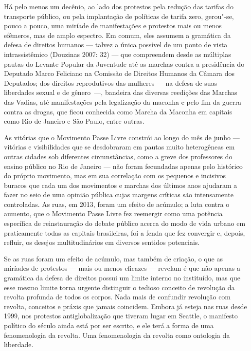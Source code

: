 Há pelo menos um decênio, ao lado dos protestos pela redução das tarifas
do transporte público, ou pela implantação de políticas de tarifa zero,
gerou"-se, pouco a pouco, uma miríade de manifestações e protestos mais
ou menos efêmeros, mas de amplo espectro. Em comum, eles assumem a
gramática da defesa de direitos humanos --- talvez a única possível de um
ponto de vista intrassistêmico (Douzinas 2007: 32) --- que compreendem
desde as múltiplas pautas do Levante Popular da Juventude até as marchas
contra a presidência do Deputado Marco Feliciano na Comissão de Direitos
Humanos da Câmara dos Deputados; dos direitos reprodutivos das mulheres
--- na defesa de suas liberdades sexual e de gênero~---, bandeira das
diversas reedições das Marchas das Vadias, até manifestações pela
legalização da maconha e pelo fim da guerra contra as drogas, que ficou
conhecida como Marcha da Maconha em capitais como Rio de Janeiro e São
Paulo, entre outras.

As vitórias que o Movimento Passe Livre constrói ao longo do mês de
junho --- vitórias e visibilidades que se desdobraram em pautas muito
heterogêneas em outras cidades sob diferentes circunstâncias, como a
greve dos professores do ensino público no Rio de Janeiro --- não foram
fecundadas apenas pelo histórico do próprio movimento, mas em sua
correlação com os pequenos e incisivos buracos que cada um dos
movimentos e marchas dos últimos anos ajudaram a fazer no seio de uma
opinião pública cujas margens críticas são intensamente controladas. As
ruas, em 2013, foram um efeito de acúmulo; a luta contra o aumento, que
o Movimento Passe Livre fez reemergir como uma potência específica de
reinstauração do debate público acerca do modo de vida urbano em
praticamente todas as capitais brasileiras, foi a fenda que fez
convergir e, depois, refluir, os desejos multitudinários em diversos
sentidos potenciais.

Se as ruas foram um efeito de acúmulo, mas também de criação, o que as
miríades de protestos --- mais ou menos eficazes --- revelam é que não
apenas a gramática da defesa de direitos possui um limite interno no
instituído, mas que esse mesmo limite torna urgente distinguir o tedioso
conceito de revolução da revolta profunda de todos os corpos. Nada mais
de confundir revolução com revolta, conceitos e práxis que jamais
coincidem. Embora já esteja nas ruas desde 1999, nos protestos
antiglobalização que tiveram lugar em Seattle, o manifesto
político do século  ainda está por ser escrito, e ele terá a forma de
uma fenomenologia da revolta. Uma fenomenologia da revolta como
ontologia da liberdade.

